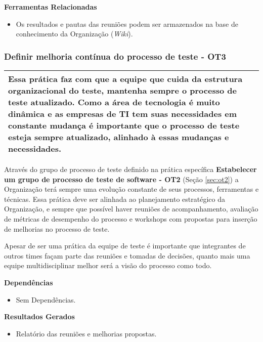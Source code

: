 \textbf{Ferramentas Relacionadas}
\begin{itemize}
    \item Os resultados e pautas das reuniões podem ser armazenados na base de conhecimento da Organização (\textit{Wiki}).
\end{itemize}

\subsubsection{Definir melhoria contínua do processo de teste - OT3}
\label{sec:ot3}

\begin{table}[H]
\centering
\begin{tabular}{|p{130mm}|}
\hline
Essa prática faz com que a equipe que cuida da estrutura organizacional do teste, mantenha sempre o processo de teste atualizado. Como a área de tecnologia é muito dinâmica e as empresas de TI tem suas necessidades em constante mudança é importante que o processo de teste esteja sempre atualizado, alinhado à essas mudanças e necessidades. \\ 
\hline
\end{tabular}
\end{table}


Através do grupo de processo de teste definido na prática específica \textbf{Estabelecer um grupo de processo de teste de software - OT2} (Seção \ref{sec:ot2}) a Organização terá sempre uma evolução constante de seus processos, ferramentas e técnicas. Essa prática deve ser alinhada ao planejamento estratégico da Organização, e sempre que possível haver reuniões de acompanhamento, avaliação de métricas de desempenho do processo e workshops com propostas para inserção de melhorias no processo de teste.

Apesar de ser uma prática da equipe de teste é importante que integrantes de outros times façam parte das reuniões e tomadas de decisões, quanto mais uma equipe multidisciplinar melhor será a visão do processo como todo.

\textbf{Dependências}
\begin{itemize}
    \item Sem Dependências.
\end{itemize}

\textbf{Resultados Gerados}
\begin{itemize}
    \item Relatório das reuniões e melhorias propostas.
\end{itemize}

